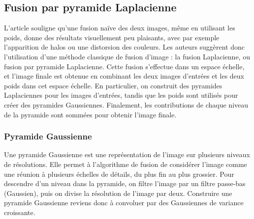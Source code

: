 \documentclass[twoside]{article}
\begin{document}
\subsection{Fusion par pyramide Laplacienne}
L'article souligne qu'une fusion naïve des deux images, même en utilisant les poids, donne des résultats visuellement peu plaisants, avec par exemple l'apparition de halos ou une distorsion des couleurs. Les auteurs suggèrent donc l'utilisation d'une méthode classique de fusion d'image : la fusion Laplacienne, ou fusion par pyramide Laplacienne. Cette fusion s'effectue dans un espace échelle, et l'image finale est obtenue en combinant les deux images d'entrées et les deux poids dans cet espace échelle. En particulier, on construit des pyramides Laplaciennes pour les images d'entrées, tandis que les poids sont utilisés pour créer des pyramides Gaussiennes. Finalement, les contributions de chaque niveau de la pyramide sont sommées pour obtenir l'image finale.\\

\subsubsection{Pyramide Gaussienne}
Une pyramide Gaussienne est une représentation de l'image sur plusieurs niveaux de résolutions. Elle permet à l'algorithme de fusion de considérer l'image comme une réunion à plusieurs échelles de détails, du plus fin au plus grossier. Pour descendre d'un niveau dans la pyramide, on filtre l'image par un filtre passe-bas (Gaussien), puis on divise la résolution de l'image par deux. Construire une pyramide Gaussienne reviens donc à convoluer par des Gaussiennes de variance croissante.
\end{document}
